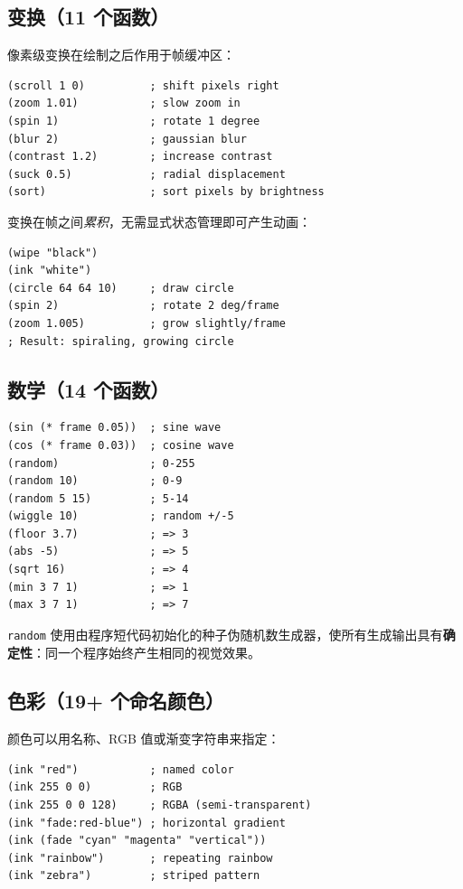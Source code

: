 \documentclass[10pt,letterpaper,twocolumn]{article}
\begin{document}
\subsection{变换（11 个函数）}

像素级变换在绘制之后作用于帧缓冲区：

\begin{lstlisting}
(scroll 1 0)          ; shift pixels right
(zoom 1.01)           ; slow zoom in
(spin 1)              ; rotate 1 degree
(blur 2)              ; gaussian blur
(contrast 1.2)        ; increase contrast
(suck 0.5)            ; radial displacement
(sort)                ; sort pixels by brightness
\end{lstlisting}

变换在帧之间\emph{累积}，无需显式状态管理即可产生动画：

\begin{lstlisting}
(wipe "black")
(ink "white")
(circle 64 64 10)     ; draw circle
(spin 2)              ; rotate 2 deg/frame
(zoom 1.005)          ; grow slightly/frame
; Result: spiraling, growing circle
\end{lstlisting}

\subsection{数学（14 个函数）}

\begin{lstlisting}
(sin (* frame 0.05))  ; sine wave
(cos (* frame 0.03))  ; cosine wave
(random)              ; 0-255
(random 10)           ; 0-9
(random 5 15)         ; 5-14
(wiggle 10)           ; random +/-5
(floor 3.7)           ; => 3
(abs -5)              ; => 5
(sqrt 16)             ; => 4
(min 3 7 1)           ; => 1
(max 3 7 1)           ; => 7
\end{lstlisting}

\texttt{random} 使用由程序短代码初始化的种子伪随机数生成器，使所有生成输出具有\textbf{确定性}：同一个程序始终产生相同的视觉效果。

\subsection{色彩（19+ 个命名颜色）}

颜色可以用名称、RGB 值或渐变字符串来指定：

\begin{lstlisting}
(ink "red")           ; named color
(ink 255 0 0)         ; RGB
(ink 255 0 0 128)     ; RGBA (semi-transparent)
(ink "fade:red-blue") ; horizontal gradient
(ink (fade "cyan" "magenta" "vertical"))
(ink "rainbow")       ; repeating rainbow
(ink "zebra")         ; striped pattern
\end{lstlisting}
\end{document}
